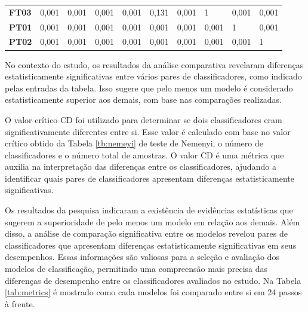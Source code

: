 \begin{table}[!htb]
\begin{tabular}{@{}llllllllll@{}}
		\textbf{FT03}                       & 0,001                          & 0,001                          & 0,001                          & 0,001                          & 0,131                          & 0,001                          & 1                          & 0,001                          & 0,001                          \\
		\textbf{PT01}                       & 0,001                          & 0,001                          & 0,001                          & 0,001                          & 0,001                          & 0,001                          & 0,001                          & 1                          & 0,001                          \\
		\textbf{PT02}                       & 0,001                          & 0,001                          & 0,001                          & 0,001                          & 0,001                          & 0,001                          & 0,001                          & 0,001                          & 1                          \\ \bottomrule
	\end{tabular}
\end{table}




No contexto do estudo, os resultados da análise comparativa revelaram diferenças estatisticamente significativas entre vários pares de classificadores, como indicado pelas entradas da tabela. Isso sugere que pelo menos um modelo é considerado estatisticamente superior aos demais, com base nas comparações realizadas.

O valor crítico CD foi utilizado para determinar se dois classificadores eram significativamente diferentes entre si. Esse valor é calculado com base no valor crítico obtido da Tabela \ref{tb:nemeyi} de teste de Nemenyi, o número de classificadores e o número total de amostras. O valor CD é uma métrica que auxilia na interpretação das diferenças entre os classificadores, ajudando a identificar quais pares de classificadores apresentam diferenças estatisticamente significativas.

Os resultados da pesquisa indicaram a existência de evidências estatísticas que sugerem a superioridade de pelo menos um modelo em relação aos demais. Além disso, a análise de comparação significativa entre os modelos revelou pares de classificadores que apresentam diferenças estatisticamente significativas em seus desempenhos. Essas informações são valiosas para a seleção e avaliação dos modelos de classificação, permitindo uma compreensão mais precisa das diferenças de desempenho entre os classificadores avaliados no estudo. Na Tabela \ref{tab:metrics} é mostrado como cada modelos foi comparado entre si em 24 passos à frente.

